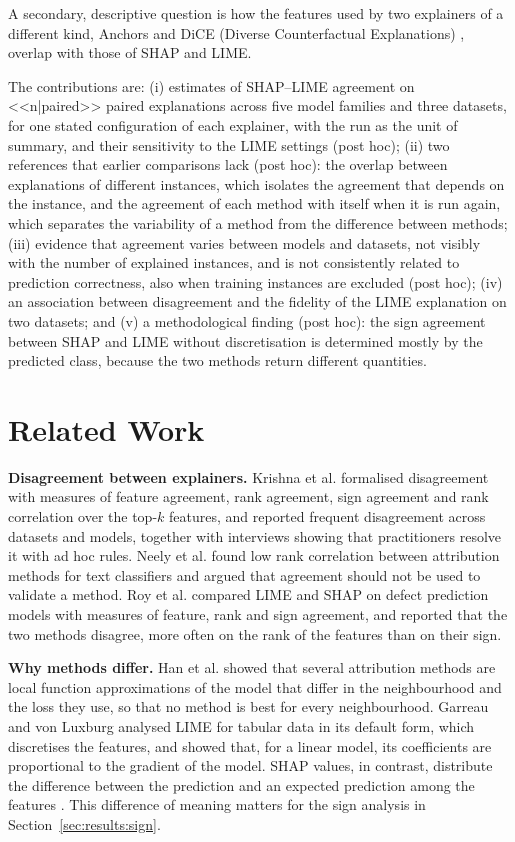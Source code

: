 A secondary, descriptive question is how the features used by two explainers of a
different kind, Anchors \cite{ribeiro2018anchors} and DiCE (Diverse Counterfactual Explanations)
\cite{mothilal2020dice},
overlap with those of SHAP and LIME.

The contributions are: (i) estimates of SHAP--LIME agreement on <<n|paired>> paired
explanations across five model families and three datasets, for one stated configuration
of each explainer, with the run as the unit of summary, and their sensitivity to the LIME
settings (post hoc); (ii) two references that earlier comparisons lack (post hoc): the overlap between
explanations of different instances, which isolates the agreement that depends on the
instance, and the
agreement of each method with itself when it is run again, which separates the variability
of a method from the difference between methods; (iii) evidence that agreement varies between
models and datasets, not visibly with the number of explained instances, and is not
consistently related to prediction correctness, also when training instances are
excluded (post hoc); (iv) an association between disagreement and the fidelity of the LIME
explanation on two datasets; and (v) a methodological finding (post hoc): the sign
agreement between SHAP and LIME without discretisation is determined mostly by the
predicted class, because the two methods return different quantities.

\section{Related Work}
\label{sec:related}

\textbf{Disagreement between explainers.} Krishna et al. \cite{krishna2024disagreement}
formalised disagreement with measures of feature agreement, rank agreement, sign
agreement and rank correlation over the top-$k$ features, and reported frequent
disagreement across datasets and models, together with interviews showing that
practitioners resolve it with ad hoc rules. Neely et al. \cite{neely2021order} found low
rank correlation between attribution methods for text classifiers and argued that
agreement should not be used to validate a method. Roy et al. \cite{roy2022why}
compared LIME and SHAP on defect prediction models with measures of feature, rank and
sign agreement, and reported that the two methods disagree, more often on the rank of the
features than on their sign.

\textbf{Why methods differ.} Han et al. \cite{han2022which} showed that several
attribution methods are local function approximations of the model that differ in the
neighbourhood and the loss they use, so that no method is best for every neighbourhood.
Garreau and von Luxburg \cite{garreau2020explaining} analysed LIME for tabular data in
its default form, which discretises the features, and showed that, for a linear model, its
coefficients are proportional to the gradient of the model. SHAP values, in contrast, distribute the difference between the prediction and
an expected prediction among the features \cite{lundberg2017unified,lundberg2020local}.
This difference of meaning matters for the sign analysis in
Section~\ref{sec:results:sign}.

